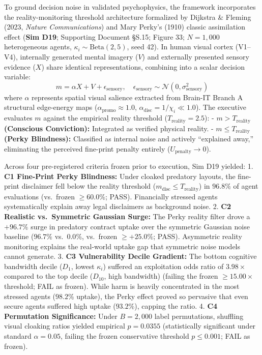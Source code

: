 \documentclass[
]{article}
\begin{document}
To ground decision noise in validated psychophysics, the framework
incorporates the reality-monitoring threshold architecture formalized by
Dijkstra \& Fleming (2023, \emph{Nature Communications}) and Mary
Perky's (1910) classic assimilation effect (\textbf{Sim D19}; Supporting
Document §S.15; Figure 33; \(N = 1,000\) heterogeneous agents,
\(\kappa_i \sim \text{Beta}(2, 5)\), seed 42). In human visual cortex
(V1--V4), internally generated mental imagery (\(V\)) and externally
presented sensory evidence (\(X\)) share identical representations,
combining into a scalar decision variable: \[
m = \alpha X + V + \epsilon_{\text{sensory}}, \quad \epsilon_{\text{sensory}} \sim \mathcal{N}(0, \sigma_{\text{sensory}}^2)
\] where \(\alpha\) represents spatial visual salience extracted from
Brain-IT Branch A structural edge-energy maps
(\(\alpha_{\text{promo}} \approx 1.0\),
\(\alpha_{\text{disc}} = 1/\chi_i \ll 1.0\)). The executive evaluates
\(m\) against the empirical reality threshold
(\(T_{\text{reality}} = 2.5\)): - \textbf{\(m > T_{\text{reality}}\)
(Conscious Conviction):} Integrated as verified physical reality. -
\textbf{\(m \le T_{\text{reality}}\) (Perky Blindness):} Classified as
internal noise and actively ``explained away,'' eliminating the
perceived fine-print penalty entirely (\(U_{\text{penalty}} \to 0\)).

Across four pre-registered criteria frozen prior to execution, Sim D19
yielded: 1. \textbf{C1 Fine-Print Perky Blindness:} Under cloaked
predatory layouts, the fine-print disclaimer fell below the reality
threshold (\(m_{\text{disc}} \le T_{\text{reality}}\)) in \(96.8\%\) of
agent evaluations (vs.~frozen \(\ge 60.0\%\); PASS). Financially
stressed agents systematically explain away legal disclaimers as
background noise. 2. \textbf{C2 Realistic vs.~Symmetric Gaussian Surge:}
The Perky reality filter drove a \(+96.7\%\) surge in predatory contract
uptake over the symmetric Gaussian noise baseline (\(96.7\%\)
vs.~\(0.0\%\), vs.~frozen \(\ge +25.0\%\); PASS). Asymmetric reality
monitoring explains the real-world uptake gap that symmetric noise
models cannot generate. 3. \textbf{C3 Vulnerability Decile Gradient:}
The bottom cognitive bandwidth decile (\(D_1\), lowest \(\kappa_i\))
suffered an exploitation odds ratio of \(3.98\times\) compared to the
top decile (\(D_{10}\), high bandwidth) (failing the frozen
\(\ge 15.00\times\) threshold; FAIL as frozen). While harm is heavily
concentrated in the most stressed agents (\(98.2\%\) uptake), the Perky
effect proved so pervasive that even secure agents suffered high uptake
(\(93.2\%\)), capping the ratio. 4. \textbf{C4 Permutation
Significance:} Under \(B = 2,000\) label permutations, shuffling visual
cloaking ratios yielded empirical \(p = 0.0355\) (statistically
significant under standard \(\alpha = 0.05\), failing the frozen
conservative threshold \(p \le 0.001\); FAIL as frozen).
\end{document}
